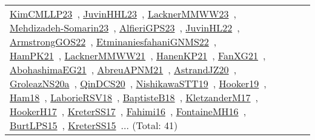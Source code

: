 {\begin{longtable}{lp{3cm}>{\raggedright\arraybackslash}p{6cm}>{\raggedright\arraybackslash}p{6cm}>{\raggedright\arraybackslash}p{8cm}}
\href{works/KimCMLLP23.pdf}{KimCMLLP23}~\cite{KimCMLLP23}, \href{works/JuvinHHL23.pdf}{JuvinHHL23}~\cite{JuvinHHL23}, \href{works/LacknerMMWW23.pdf}{LacknerMMWW23}~\cite{LacknerMMWW23}, \href{works/Mehdizadeh-Somarin23.pdf}{Mehdizadeh-Somarin23}~\cite{Mehdizadeh-Somarin23}, \href{works/AlfieriGPS23.pdf}{AlfieriGPS23}~\cite{AlfieriGPS23}, \href{works/JuvinHL22.pdf}{JuvinHL22}~\cite{JuvinHL22}, \href{works/ArmstrongGOS22.pdf}{ArmstrongGOS22}~\cite{ArmstrongGOS22}, \href{works/EtminaniesfahaniGNMS22.pdf}{EtminaniesfahaniGNMS22}~\cite{EtminaniesfahaniGNMS22}, \href{works/HamPK21.pdf}{HamPK21}~\cite{HamPK21}, \href{works/LacknerMMWW21.pdf}{LacknerMMWW21}~\cite{LacknerMMWW21}, \href{works/HanenKP21.pdf}{HanenKP21}~\cite{HanenKP21}, \href{works/FanXG21.pdf}{FanXG21}~\cite{FanXG21}, \href{works/AbohashimaEG21.pdf}{AbohashimaEG21}~\cite{AbohashimaEG21}, \href{works/AbreuAPNM21.pdf}{AbreuAPNM21}~\cite{AbreuAPNM21}, \href{works/AstrandJZ20.pdf}{AstrandJZ20}~\cite{AstrandJZ20}, \href{works/GroleazNS20a.pdf}{GroleazNS20a}~\cite{GroleazNS20a}, \href{works/QinDCS20.pdf}{QinDCS20}~\cite{QinDCS20}, \href{works/NishikawaSTT19.pdf}{NishikawaSTT19}~\cite{NishikawaSTT19}, \href{works/Hooker19.pdf}{Hooker19}~\cite{Hooker19}, \href{works/Ham18.pdf}{Ham18}~\cite{Ham18}, \href{works/LaborieRSV18.pdf}{LaborieRSV18}~\cite{LaborieRSV18}, \href{works/BaptisteB18.pdf}{BaptisteB18}~\cite{BaptisteB18}, \href{works/KletzanderM17.pdf}{KletzanderM17}~\cite{KletzanderM17}, \href{works/HookerH17.pdf}{HookerH17}~\cite{HookerH17}, \href{works/KreterSS17.pdf}{KreterSS17}~\cite{KreterSS17}, \href{works/Fahimi16.pdf}{Fahimi16}~\cite{Fahimi16}, \href{works/FontaineMH16.pdf}{FontaineMH16}~\cite{FontaineMH16}, \href{works/BurtLPS15.pdf}{BurtLPS15}~\cite{BurtLPS15}, \href{works/KreterSS15.pdf}{KreterSS15}~\cite{KreterSS15}... (Total: 41)\\

\end{longtable}}
